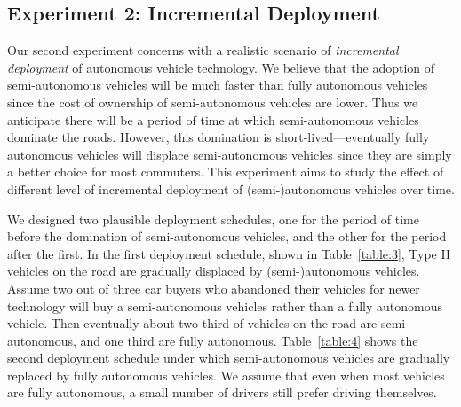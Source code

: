 \subsection{Experiment 2: Incremental Deployment}

Our second experiment concerns with a realistic scenario of
\emph{incremental deployment} of autonomous vehicle technology.  We
believe that the adoption of semi-autonomous vehicles will be much
faster than fully autonomous vehicles since the cost of ownership of
semi-autonomous vehicles are lower.  Thus we anticipate there will be
a period of time at which semi-autonomous vehicles dominate the roads.
However, this domination is short-lived---eventually fully autonomous
vehicles will displace semi-autonomous vehicles since they are simply
a better choice for most commuters.  This experiment aims to study the
effect of different level of incremental deployment of
(semi-)autonomous vehicles over time.

We designed two plausible deployment schedules, one for the period of
time before the domination of semi-autonomous vehicles, and the other
for the period after the first.  In the first deployment schedule,
shown in Table~\ref{table:3}, Type H vehicles on the road are
gradually displaced by (semi-)autonomous vehicles.  Assume two out of
three car buyers who abandoned their vehicles for newer technology
will buy a semi-autonomous vehicles rather than a fully autonomous
vehicle.  Then eventually about two third of vehicles on the road are
semi-autonomous, and one third are fully autonomous.
Table~\ref{table:4} shows the second deployment schedule under which
semi-autonomous vehicles are gradually replaced by fully autonomous
vehicles. We assume that even when most vehicles are fully autonomous,
a small number of drivers still prefer driving themselves.

